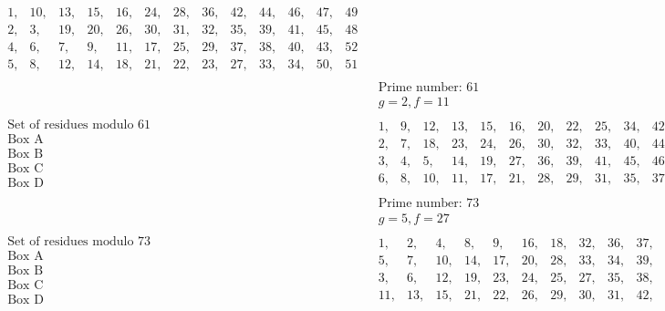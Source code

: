 \documentclass[twoside,12pt, showframe]{memoir}
\begin{document}
\[\begin{aligned}
\begin{array}{|rrrrrrrrrrrrr} 
1,&10,&13,&15,&16,&24,&28,&36,&42,&44,&46,&47,&49 \\ 
2,&3,& 19,&20,&26,&30,&31,&32,&35,&39,&41,&45,&48 \\ 
4,& 6,& 7,&9,&11,&17,&25,&29,&37,&38,&40,&43,&52 \\ 
5,&8,&12,&14,&18,&21,&22,& 23,&27,&33,&34,&50,&51
\end{array} \\
& \begin{array}{c} \text{Prime number: }61 \\  g=2, f=11 \end{array} \\
\begin{array}{l} \text{Set of residues modulo }61 \\ \text{Box A} \\ \text{Box B} \\ \text{Box C} \\ \text{Box D} \end{array} & 
\begin{array}{|rrrrrrrrrrrrrrr} 
1,&9,&12,&13,&15,&16,&20,&22,&25,&34,&42,&47,&56,&57,&58 \\ 
2,&7,& 18,&23,&24,&26,&30,&32,&33,&40,&44,&50,&51,&53,&55 \\ 
3,& 4,& 5,&14,&19,&27,&36,&39,&41,&45,&46,&48,&49,&52,&60 \\ 
6,&8,&10,&11,&17,&21,&28,& 29,&31,&35,&37,&38,&43,&54,&59
\end{array} \\
& \begin{array}{c} \text{Prime number: }73 \\  g=5, f=27 \end{array} \\
\begin{array}{l} \text{Set of residues modulo }73 \\ \text{Box A} \\ \text{Box B} \\ \text{Box C} \\ \text{Box D} \end{array} & 
\begin{array}{|rrrrrrrrrrrrrrrrrr} 
1,&2,&4,&8,&9,&16,&18,&32,&36,&37,&41,&55,&57,&64,&65,&69,&71,&72 \\ 
5,&7,& 10,&14,&17,&20,&28,&33,&34,&39,&40,&45,&53,&56,&59,&63,&66,&68 \\ 
3,& 6,& 12,&19,&23,&24,&25,&27,&35,&38,&46,&48,&49,&50,&54,&61,&67,&70 \\ 
11,&13,&15,&21,&22,&26,&29,& 30,&31,&42,&43,&44,&47,&51,&52,&58,&60,&62
\end{array}  \\
\end{aligned}\]\clearpage\noindent
%
\end{document}
